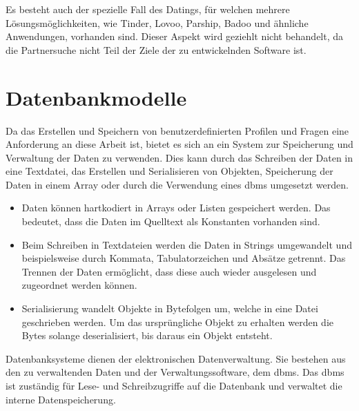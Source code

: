 Es besteht auch der spezielle Fall des Datings, für welchen mehrere Lösungsmöglichkeiten, wie Tinder, Lovoo, Parship, Badoo und ähnliche Anwendungen, vorhanden sind. Dieser Aspekt wird geziehlt nicht behandelt, da die Partnersuche nicht Teil der Ziele der zu entwickelnden Software ist.

\section{Datenbankmodelle}
\label{sec:datenbankmodelle}

Da das Erstellen und Speichern von benutzerdefinierten Profilen und Fragen eine Anforderung an diese Arbeit ist, bietet es sich an ein System zur Speicherung und Verwaltung der Daten zu verwenden. Dies kann durch das Schreiben der Daten in eine Textdatei, das Erstellen und Serialisieren von Objekten, Speicherung der Daten in einem Array oder durch die Verwendung eines \gls{dbms} umgesetzt werden.

\begin{itemize}
      \item Daten können hartkodiert in Arrays oder Listen gespeichert werden. Das bedeutet, dass die Daten im Quelltext als Konstanten vorhanden sind.
      \item Beim Schreiben in Textdateien werden die Daten in Strings umgewandelt und beispielsweise durch Kommata, Tabulatorzeichen und Absätze getrennt. Das Trennen der Daten ermöglicht, dass diese auch wieder ausgelesen und zugeordnet werden können.
      \item Serialisierung wandelt Objekte in Bytefolgen um, welche in eine Datei geschrieben werden. Um das ursprüngliche Objekt zu erhalten werden die Bytes solange deserialisiert, bis daraus ein Objekt entsteht.
\end{itemize}

Datenbanksysteme dienen der elektronischen Datenverwaltung. Sie bestehen aus den zu verwaltenden Daten und der Verwaltungssoftware, dem \gls{dbms}. Das \gls{dbms} ist zuständig für Lese- und Schreibzugriffe auf die Datenbank und verwaltet die interne Datenspeicherung.

